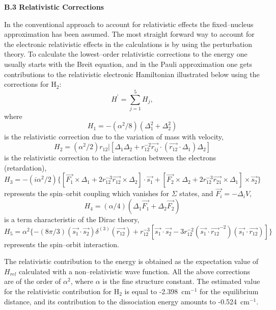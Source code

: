 \vspace{2mm}
\noindent
{\bf B.3 Relativistic Corrections}



In the conventional approach to account for relativistic 
effects the 
fixed--nucleus approximation has been assumed.
The most straight forward way to account for the 
electronic relativistic
effects in the calculations is by using the perturbation theory.
To calculate the lowest--order relativistic corrections to the
energy one usually starts with the Breit equation,\cite{k15}
and in the Pauli approximation one gets contributions to the 
relativistic electronic Hamiltonian illustrated below using the
corrections for H$_2$:
\begin{equation}
H^{\prime} = \sum_{j=1}^{5} H_j,
\end{equation}
where
\begin{equation}
H_1 = -(\alpha^2/8)(\Delta_1^2 + \Delta_2^2)
\end{equation}
is the relativistic correction due to the variation of mass with velocity,
\begin{equation} 
H_2 = (\alpha^2/2) r_{12} | [\Delta_1 \Delta_2 +
r_{12}^{-2} \vec{r_{ij}} \cdot (\vec{r_{12}} \cdot \Delta_1)\Delta_2]
\end{equation}
is the relativistic correction to the interaction
between the electrons (retardation),
\begin{equation}
H_3 = -(i \alpha^2/2) \{ [ \vec{F_1} \times \Delta_1 +
2 r_{12}^{-3}  \vec{r_{12}} \times \Delta_2 ] \cdot \vec{s_1}
+ [\vec{F_2} \times \Delta_2 + 2 r_{12}^{-3} \vec{r_{21}}
\times \Delta_1] \times \vec{s_2} \}
\end{equation}
represents the spin--orbit coupling which vanishes for $\Sigma$
states, and $\vec{F_i} = -\Delta_i V$,
\begin{equation}
H_4 = (\alpha / 4) (\Delta_1 \vec{F_1} + \Delta_2 \vec{F_2})
\end{equation}
is a term  characteristic of the Dirac theory,
\begin{equation}
H_5 = \alpha^2 \{ -(8\pi/3)(\vec{s_1} \cdot \vec{s_2})
\delta^{(3)}(\vec{r_{12}}) +
r_{12}^{-3} [\vec{s_1} \cdot \vec{s_2} -
3 r_{12}^{-2} (\vec{s_1} \cdot \vec{r_{12}}^{-2})
(\vec{s_1} \cdot \vec{r_{12}} ) ] \}
\end{equation}
represents the spin--orbit interaction.

The relativistic contribution to the energy is obtained as the 
expectation value of $H_{rel}$ calculated with a non--relativistic
wave function. All the above corrections are of the order of
$\alpha^2$, where $\alpha$ is the fine structure constant.
The estimated value for the relativistic contribution for H$_2$ is 
equal to -2.398~cm$^{-1}$ for the equilibrium distance,\cite{kk} and
its contribution to the dissociation energy amounts to
-0.524~cm$^{-1}$.

